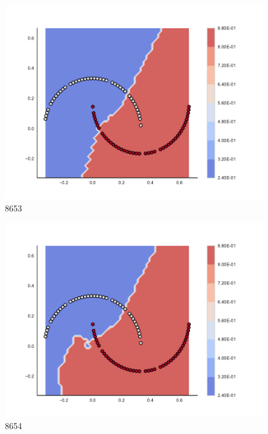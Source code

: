 \begin{subfigure}[b]{0.09\textwidth}
    \includegraphics[clip, trim=2.35cm 1.75cm 4.5cm 0cm,width=\textwidth]{img/convergence/8653.pdf}
    \caption{8653}
    \label{fig:convergence_8653}
\end{subfigure}
%
\begin{subfigure}[b]{0.09\textwidth}
    \includegraphics[clip, trim=2.35cm 1.75cm 4.5cm 0cm,width=\textwidth]{img/convergence/8654.pdf}
    \caption{8654}
    \label{fig:convergence_8654}
\end{subfigure}
%
